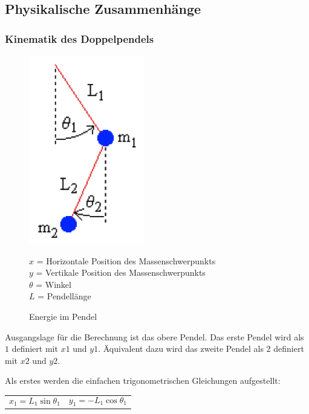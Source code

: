 \documentclass[12pt]{article}
\numberwithin{equation}{subsection}
\begin{document}
\subsection{Physikalische Zusammenhänge}

\subsubsection{Kinematik des Doppelpendels}
\begin{figure}[!h]
	\begin{minipage}[!b]{0.4\textwidth}
		\centering
		\includegraphics[scale=1]{energy.png}
		\caption{Energie im Pendel}
		\label{fig:energy}
	\end{minipage}
	\begin{minipage}[!t]{\textwidth}
		\vspace{0pt}\raggedright
		$x$ = Horizontale Position des Massenschwerpunkts\\
		$y$ = Vertikale Position des Massenschwerpunkts\\
		$\theta$ = Winkel\\
		$L$ = Pendellänge
	\end{minipage}
\end{figure}

Ausgangslage für die Berechnung ist das obere Pendel. Das erste Pendel wird als $1$ definiert mit $x1$ und $y1$. Äquivalent dazu wird das zweite Pendel als $2$ definiert mit $x2$ und $y2$.

Als erstes werden die einfachen trigonometrischen Gleichungen aufgestellt:

\begin{tabularx}{\textwidth}{X X}
	\begin{equation} \label{eq:energy:1_1}
		x_1 = L_1\sin\theta_1
	\end{equation}
	&
	\begin{equation} \label{eq:energy:1_2}
		y_1 = -L_1\cos\theta_1
	\end{equation}
\end{tabularx}
\end{document}
